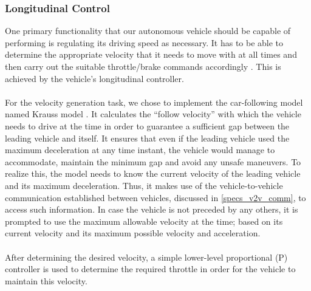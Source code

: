 \subsubsection{Longitudinal Control}
\label{specs_long_ctrl}
One primary functionality that our autonomous vehicle should be capable of performing is regulating its driving speed as necessary. It has to be able to determine the appropriate velocity that it needs to move with at all times and then carry out the suitable throttle/brake commands accordingly \cite{LongCtrl}. This is achieved by the vehicle’s longitudinal controller. \\ \\
For the velocity generation task, we chose to implement the car-following model named Krauss model \cite{Krau1998MicroscopicMO}. It calculates the “follow velocity” with which the vehicle needs to drive at the time in order to guarantee a sufficient gap between the leading vehicle and itself. It ensures that even if the leading vehicle used the maximum deceleration at any time instant, the vehicle would manage to accommodate, maintain the minimum gap and avoid any unsafe maneuvers. To realize this, the model needs to know the current velocity of the leading vehicle and its maximum deceleration. Thus, it makes use of the vehicle-to-vehicle communication established between vehicles, discussed in \ref{specs_v2v_comm}, to access such information. In case the vehicle is not preceded by any others, it is prompted to use the maximum allowable velocity at the time; based on its current velocity and its maximum possible velocity and acceleration. \\ \\
After determining the desired velocity, a simple lower-level proportional (P) controller is used to determine the required throttle in order for the vehicle to maintain this velocity.


